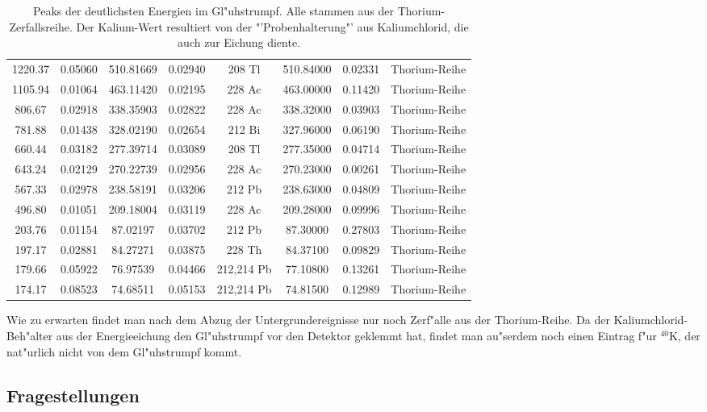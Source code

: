 \documentclass[12pt]{article}
\begin{document}
\begin{table}[h!]
{\begin{tabular}{cccccccc}
			\rowcolor[rgb]{ .949,  .949,  .949} 1220.37 & 0.05060 & 510.81669 & 0.02940 & 208 Tl & 510.84000 & 0.02331 & Thorium-Reihe \\
			1105.94 & 0.01064 & 463.11420 & 0.02195 & 228 Ac & 463.00000 & 0.11420 & Thorium-Reihe \\
			\rowcolor[rgb]{ .949,  .949,  .949} 806.67 & 0.02918 & 338.35903 & 0.02822 & 228 Ac & 338.32000 & 0.03903 & Thorium-Reihe \\
			781.88 & 0.01438 & 328.02190 & 0.02654 & 212 Bi & 327.96000 & 0.06190 & Thorium-Reihe \\
			\rowcolor[rgb]{ .949,  .949,  .949} 660.44 & 0.03182 & 277.39714 & 0.03089 & 208 Tl & 277.35000 & 0.04714 & Thorium-Reihe \\
			643.24 & 0.02129 & 270.22739 & 0.02956 & 228 Ac & 270.23000 & 0.00261 & Thorium-Reihe \\
			\rowcolor[rgb]{ .949,  .949,  .949} 567.33 & 0.02978 & 238.58191 & 0.03206 & 212 Pb & 238.63000 & 0.04809 & Thorium-Reihe \\
			496.80 & 0.01051 & 209.18004 & 0.03119 & 228 Ac & 209.28000 & 0.09996 & Thorium-Reihe \\
			\rowcolor[rgb]{ .949,  .949,  .949} 203.76 & 0.01154 & 87.02197 & 0.03702 & 212 Pb & 87.30000 & 0.27803 & Thorium-Reihe \\
			197.17 & 0.02881 & 84.27271 & 0.03875 & 228 Th & 84.37100 & 0.09829 & Thorium-Reihe \\
			\rowcolor[rgb]{ .949,  .949,  .949} 179.66 & 0.05922 & 76.97539 & 0.04466 & 212,214 Pb & 77.10800 & 0.13261 & Thorium-Reihe \\
			174.17 & 0.08523 & 74.68511 & 0.05153 & 212,214 Pb & 74.81500 & 0.12989 & Thorium-Reihe \\
		\end{tabular}%
	}
	\caption{Peaks der deutlichsten Energien im Gl"uhstrumpf. Alle stammen aus der Thorium-Zerfallsreihe. Der Kalium-Wert resultiert von der "'Probenhalterung"' aus Kaliumchlorid, die auch zur Eichung diente.}
	\label{tab:addlabel}%
\end{table}%
\noindent
Wie zu erwarten findet man nach dem Abzug der Untergrundereignisse nur noch Zerf"alle aus der Thorium-Reihe. Da der Kaliumchlorid-Beh"alter aus der Energieeichung den Gl"uhstrumpf vor den Detektor geklemmt hat, findet man au"serdem noch einen Eintrag f"ur $^{40}$K, der nat"urlich nicht von dem Gl"uhstrumpf kommt.

\subsection{Fragestellungen}
\end{document}
